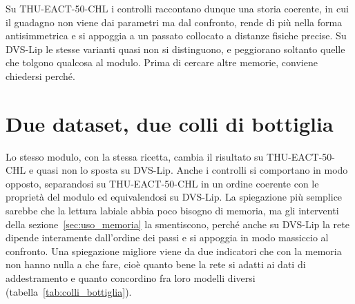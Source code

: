 Su THU-EACT-50-CHL i controlli raccontano dunque una storia coerente, in cui il guadagno non viene dai parametri ma dal confronto, rende di più nella forma antisimmetrica e si appoggia a un passato collocato a distanze fisiche precise. Su DVS-Lip le stesse varianti quasi non si distinguono, e peggiorano soltanto quelle che tolgono qualcosa al modulo. Prima di cercare altre memorie, conviene chiedersi perché.



\section{Due dataset, due colli di bottiglia}
\label{sec:colli_bottiglia}

Lo stesso modulo, con la stessa ricetta, cambia il risultato su THU-EACT-50-CHL e quasi non lo sposta su DVS-Lip. Anche i controlli si comportano in modo opposto, separandosi su THU-EACT-50-CHL in un ordine coerente con le proprietà del modulo ed equivalendosi su DVS-Lip. La spiegazione più semplice sarebbe che la lettura labiale abbia poco bisogno di memoria, ma gli interventi della sezione~\ref{sec:uso_memoria} la smentiscono, perché anche su DVS-Lip la rete dipende interamente dall'ordine dei passi e si appoggia in modo massiccio al confronto. Una spiegazione migliore viene da due indicatori che con la memoria non hanno nulla a che fare, cioè quanto bene la rete si adatti ai dati di addestramento e quanto concordino fra loro modelli diversi (tabella~\ref{tab:colli_bottiglia}).

